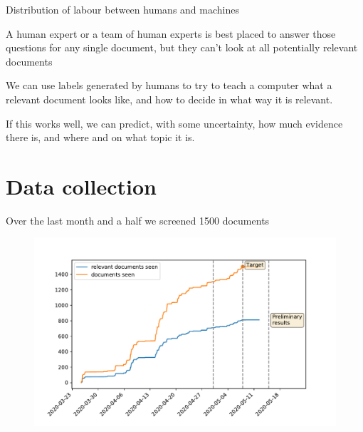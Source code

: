 \documentclass[9pt]{beamer}
\begin{document}
\begin{frame}{Distribution of labour between humans and machines}

A human expert or a team of human experts is best placed to answer those questions for any single document, but they can't look at all potentially relevant documents

\bigskip

We can use labels generated by humans to try to teach a computer what a relevant document looks like, and how to decide in what way it is relevant. 

\bigskip

If this works well, we can predict, with some uncertainty, how much evidence there is, and where and on what topic it is.

\end{frame}

\section{Data collection}
\begin{frame}
\tableofcontents[currentsection]
\end{frame}

\begin{frame}{Over the last month and a half we screened 1500 documents}

\begin{figure}
	\includegraphics[width=\linewidth]{../plots/progress/plan.pdf}
\end{figure}

\end{frame}
\end{document}
